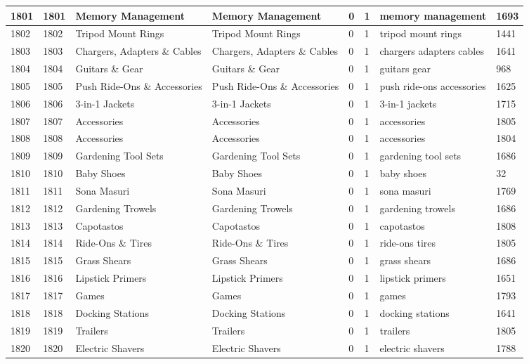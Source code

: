 \begin{longtable}{|l|l|l|l|l|l|l|l|}
1801 & 1801 & Memory Management & Memory Management & 0 & 1 & memory management & 1693 \\ \hline 
1802 & 1802 & Tripod Mount Rings & Tripod Mount Rings & 0 & 1 & tripod mount rings & 1441 \\ \hline 
1803 & 1803 & Chargers, Adapters \& Cables & Chargers, Adapters \& Cables & 0 & 1 & chargers adapters cables & 1641 \\ \hline 
1804 & 1804 & Guitars \& Gear & Guitars \& Gear & 0 & 1 & guitars gear & 968 \\ \hline 
1805 & 1805 & Push Ride-Ons \& Accessories & Push Ride-Ons \& Accessories & 0 & 1 & push ride-ons accessories & 1625 \\ \hline 
1806 & 1806 & 3-in-1 Jackets & 3-in-1 Jackets & 0 & 1 & 3-in-1 jackets & 1715 \\ \hline 
1807 & 1807 & Accessories & Accessories & 0 & 1 & accessories & 1805 \\ \hline 
1808 & 1808 & Accessories & Accessories & 0 & 1 & accessories & 1804 \\ \hline 
1809 & 1809 & Gardening Tool Sets & Gardening Tool Sets & 0 & 1 & gardening tool sets & 1686 \\ \hline 
1810 & 1810 & Baby Shoes & Baby Shoes & 0 & 1 & baby shoes & 32 \\ \hline 
1811 & 1811 & Sona Masuri & Sona Masuri & 0 & 1 & sona masuri & 1769 \\ \hline 
1812 & 1812 & Gardening Trowels & Gardening Trowels & 0 & 1 & gardening trowels & 1686 \\ \hline 
1813 & 1813 & Capotastos & Capotastos & 0 & 1 & capotastos & 1808 \\ \hline 
1814 & 1814 & Ride-Ons \& Tires & Ride-Ons \& Tires & 0 & 1 & ride-ons tires & 1805 \\ \hline 
1815 & 1815 & Grass Shears & Grass Shears & 0 & 1 & grass shears & 1686 \\ \hline 
1816 & 1816 & Lipstick Primers & Lipstick Primers & 0 & 1 & lipstick primers & 1651 \\ \hline 
1817 & 1817 & Games & Games & 0 & 1 & games & 1793 \\ \hline 
1818 & 1818 & Docking Stations & Docking Stations & 0 & 1 & docking stations & 1641 \\ \hline 
1819 & 1819 & Trailers & Trailers & 0 & 1 & trailers & 1805 \\ \hline 
1820 & 1820 & Electric Shavers & Electric Shavers & 0 & 1 & electric shavers & 1788 \\ \hline 

\end{longtable}

